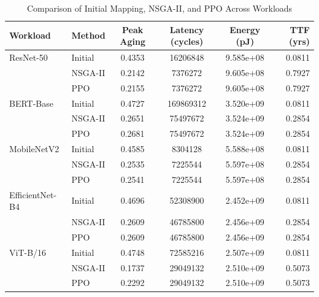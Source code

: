 \begin{table}[h]
\centering
\caption{Comparison of Initial Mapping, NSGA-II, and PPO Across Workloads}
\label{tab:method_comparison}
\begin{tabular}{llcccr}
\toprule
Workload & Method & Peak Aging & Latency (cycles) & Energy (pJ) & TTF (yrs) \\
\midrule
ResNet-50 & Initial & 0.4353 & 16206848 & 9.585e+08 & 0.0811 \\
 & NSGA-II & 0.2142 & 7376272 & 9.605e+08 & 0.7927 \\
 & PPO & 0.2155 & 7376272 & 9.605e+08 & 0.7927 \\
\midrule
BERT-Base & Initial & 0.4727 & 169869312 & 3.520e+09 & 0.0811 \\
 & NSGA-II & 0.2651 & 75497672 & 3.524e+09 & 0.2854 \\
 & PPO & 0.2681 & 75497672 & 3.524e+09 & 0.2854 \\
\midrule
MobileNetV2 & Initial & 0.4585 & 8304128 & 5.588e+08 & 0.0811 \\
 & NSGA-II & 0.2535 & 7225544 & 5.597e+08 & 0.2854 \\
 & PPO & 0.2541 & 7225544 & 5.597e+08 & 0.2854 \\
\midrule
EfficientNet-B4 & Initial & 0.4696 & 52308900 & 2.452e+09 & 0.0811 \\
 & NSGA-II & 0.2609 & 46785800 & 2.456e+09 & 0.2854 \\
 & PPO & 0.2609 & 46785800 & 2.456e+09 & 0.2854 \\
\midrule
ViT-B/16 & Initial & 0.4748 & 72585216 & 2.507e+09 & 0.0811 \\
 & NSGA-II & 0.1737 & 29049132 & 2.510e+09 & 0.5073 \\
 & PPO & 0.2292 & 29049132 & 2.510e+09 & 0.5073 \\
\bottomrule
\end{tabular}
\end{table}